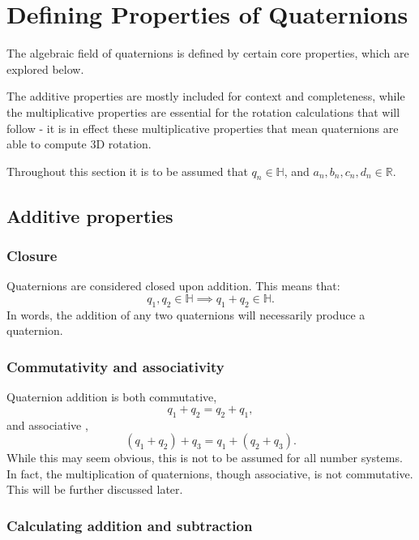 \documentclass[10pt]{article}
\begin{document}
\pagebreak
\section{Defining Properties of Quaternions}

The algebraic field of quaternions is defined by certain core properties, which are explored below.

The additive properties are mostly included for context and completeness, while the multiplicative properties are essential for the rotation calculations that will follow - it is in effect these multiplicative properties that mean quaternions are able to compute 3D rotation.

Throughout this section it is to be assumed that $q_n \in \mathbb{H}$, and $a_n, b_n, c_n, d_n \in \mathbb{R}$.

\subsection{Additive properties}

\subsubsection{Closure}

Quaternions are considered closed upon addition. This means that:
\begin{equation}
    q_1, q_2 \in \mathbb{H} \implies q_1 + q_2 \in \mathbb{H}.
\end{equation}
In words, the addition of any two quaternions will necessarily produce a quaternion. \cite{Illinois}

\subsubsection{Commutativity and associativity}

Quaternion addition is both commutative,
\begin{equation}
    q_1 + q_2 = q_2 + q_1,
\end{equation}
and associative \cite{Illinois},
\begin{equation}
    (q_1 + q_2) + q_3 = q_1 + (q_2 + q_3).
\end{equation}
While this may seem obvious, this is not to be assumed for all number systems. In fact, the multiplication of quaternions, though associative, is not commutative. This will be further discussed later.

\subsubsection{Calculating addition and subtraction}
\end{document}
